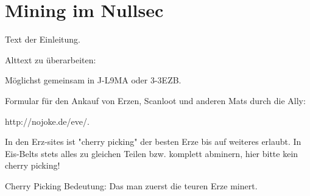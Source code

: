 \section{Mining im Nullsec}
Text der Einleitung.

Alttext zu überarbeiten: 

Möglichst gemeinsam in J-L9MA oder 3-3EZB.

Formular für den Ankauf von Erzen, Scanloot und anderen Mats durch die Ally: 

http://nojoke.de/eve/.

In den Erz-sites ist "cherry picking" der besten Erze bis auf weiteres erlaubt.
In Eis-Belts stets alles zu gleichen Teilen bzw. komplett abminern, hier bitte kein cherry picking!

Cherry Picking Bedeutung: Das man zuerst die teuren Erze minert.
